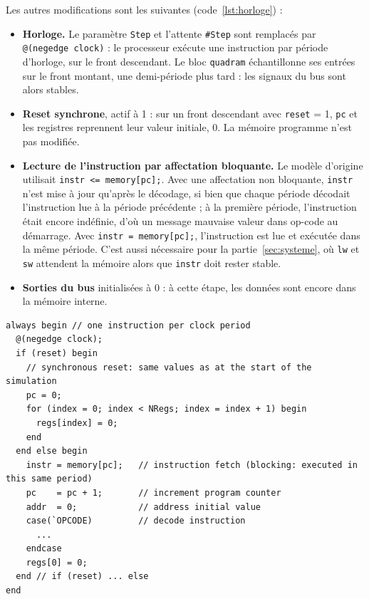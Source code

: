 Les autres modifications sont les suivantes (code~\ref{lst:horloge}) :
\begin{itemize}
\item \textbf{Horloge.} Le paramètre \texttt{Step} et l'attente \texttt{\#Step} sont remplacés
par \lstinline[style=vlinline]|@(negedge clock)| : le processeur exécute une instruction par
période d'horloge, sur le front descendant. Le bloc \texttt{quadram} échantillonne ses entrées
sur le front montant, une demi-période plus tard : les signaux du bus sont alors stables.
\item \textbf{Reset synchrone}, actif à 1 : sur un front descendant avec \texttt{reset} = 1,
\texttt{pc} et les registres reprennent leur valeur initiale, 0. La mémoire programme n'est pas
modifiée.
\item \textbf{Lecture de l'instruction par affectation bloquante.} Le modèle d'origine utilisait
\lstinline[style=vlinline]|instr <= memory[pc];|. Avec une affectation non bloquante,
\texttt{instr} n'est mise à jour qu'après le décodage, si bien que chaque période décodait
l'instruction lue à la période précédente ; à la première période, l'instruction était encore
indéfinie, d'où un message \og mauvaise valeur dans op-code\fg{} au démarrage. Avec
\lstinline[style=vlinline]|instr = memory[pc];|, l'instruction est lue et exécutée dans la même
période. C'est aussi nécessaire pour la partie~\ref{sec:systeme}, où \texttt{lw} et \texttt{sw}
attendent la mémoire alors que \texttt{instr} doit rester stable.
\item \textbf{Sorties du bus} initialisées à 0 : à cette étape, les données sont encore dans la
mémoire interne.
\end{itemize}

\noindent\begin{minipage}{\linewidth}
\begin{lstlisting}[style=verilog, caption={Boucle principale du processeur avec horloge et reset}, label={lst:horloge}]
always begin // one instruction per clock period
  @(negedge clock);
  if (reset) begin
    // synchronous reset: same values as at the start of the simulation
    pc = 0;
    for (index = 0; index < NRegs; index = index + 1) begin
      regs[index] = 0;
    end
  end else begin
    instr = memory[pc];   // instruction fetch (blocking: executed in this same period)
    pc    = pc + 1;       // increment program counter
    addr  = 0;            // address initial value
    case(`OPCODE)         // decode instruction
      ...
    endcase
    regs[0] = 0;
  end // if (reset) ... else
end
\end{lstlisting}
\end{minipage}\par


